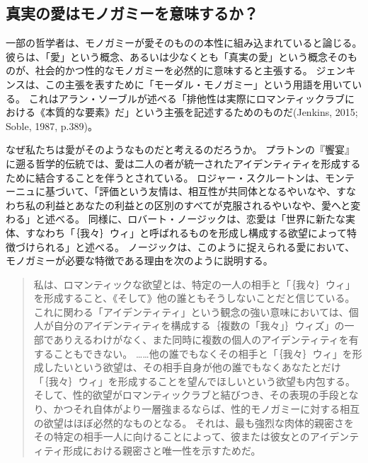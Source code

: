\documentclass[paper=a4,book,openany]{jlreq}
\begin{document}
\subsection{真実の愛はモノガミーを意味するか？}

一部の哲学者は、モノガミーが愛そのものの本性に組み込まれていると論じる。
彼らは、「愛」という概念、あるいは少なくとも「真実の愛」という概念そのものが、社会的かつ性的なモノガミーを必然的に意味すると主張する\citep{mckeever17:_is_requir_sexual_exclus_consis_roman_love}。
ジェンキンスは、この主張を表すために「モーダル・モノガミー」という用語を用いている。
これはアラン・ソーブルが述べる「排他性は実際にロマンティックラブにおける《本質的な要素》だ」という主張を記述するためのものだ(Jenkins, 2015; Soble, 1987, p.389)。
\nocite{jenkins15:_modal_monog}\nocite{soble87:_unity_roman_love}

なぜ私たちは愛がそのようなものだと考えるのだろうか。
プラトンの『饗宴』に遡る哲学的伝統では、愛は二人の者が統一されたアイデンティティを形成するために結合することを伴うとされている。
ロジャー・スクルートンは、モンテーニュに基づいて、「評価という友情は、相互性が共同体となるやいなや、すなわち私の利益とあなたの利益との区別のすべてが克服されるやいなや、愛へと変わる」と述べる。
同様に、ロバート・ノージックは、恋愛は「世界に新たな実体、すなわち「｛我々｝{ウィ}」と呼ばれるものを形成し構成する欲望によって特徴づけられる」と述べる\citep[p.230]{scruton06:_sexual_desir}。
ノージックは、このように捉えられる愛において、モノガミーが必要な特徴である理由を次のように説明する。

\begin{quote}
私は、ロマンティックな欲望とは、特定の一人の相手と「｛我々｝{ウィ}」を形成すること、《そして》他の誰ともそうしないことだと信じている。
これに関わる「アイデンティティ」という観念の強い意味においては、個人が自分のアイデンティティを構成する｛複数の「我々」｝{ウィズ}」の一部でありえるわけがなく、また同時に複数の個人のアイデンティティを有することもできない。
……他の誰でもなくその相手と「｛我々｝{ウィ}」を形成したいという欲望は、その相手自身が他の誰でもなくあなたとだけ「｛我々｝{ウィ}」を形成することを望んでほしいという欲望も内包する。
そして、性的欲望がロマンティックラブと結びつき、その表現の手段となり、かつそれ自体がより一層強まるならば、性的モノガミーに対する相互の欲望はほぼ必然的なものとなる。
それは、最も強烈な肉体的親密さをその特定の相手一人に向けることによって、彼または彼女とのアイデンティティ形成における親密さと唯一性を示すためだ。
\citep[p.89]{nozick89:_examined_life}
\end{quote}
\end{document}
